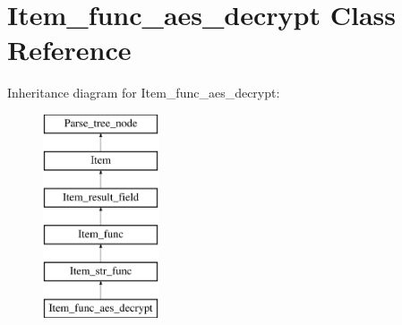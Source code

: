 \hypertarget{classItem__func__aes__decrypt}{}\section{Item\+\_\+func\+\_\+aes\+\_\+decrypt Class Reference}
\label{classItem__func__aes__decrypt}
Inheritance diagram for Item\+\_\+func\+\_\+aes\+\_\+decrypt\+:\begin{figure}[H]
\begin{center}
\leavevmode
\includegraphics[height=6.000000cm]{classItem__func__aes__decrypt}
\end{center}
\end{figure}

